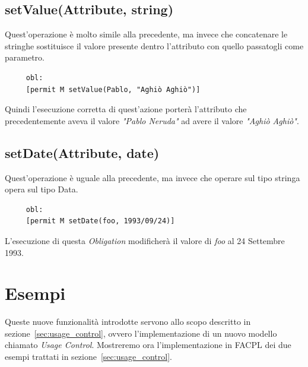 \subsection*{setValue(Attribute, string)}
\label{ssub:opsetvalue}

Quest'operazione è molto simile alla precedente, ma invece che concatenare le stringhe sostituisce il valore presente dentro l'attributo con quello passatogli come parametro.
\begin{verbatim}
	 obl:
     [permit M setValue(Pablo, "Aghiò Aghiò")]
\end{verbatim}
Quindi l'esecuzione corretta di quest'azione porterà l'attributo che precedentemente aveva il valore 
\textit{"Pablo Neruda"} ad avere il valore \textit{"Aghiò Aghiò"}.


\subsection*{setDate(Attribute, date)}
\label{ssub:opsetvalue}

Quest'operazione è uguale alla precedente, ma invece che operare sul tipo stringa opera sul tipo Data.
\begin{verbatim}
	 obl:
     [permit M setDate(foo, 1993/09/24)]
\end{verbatim}
L'esecuzione di questa \textit{Obligation} modificherà il valore di \textit{foo} al 24 Settembre 1993.


\section{Esempi} %
\label{sec:esempi}

Queste nuove funzionalità introdotte servono allo scopo descritto in sezione~\ref{sec:usage_control}, ovvero l'implementazione di un nuovo modello chiamato \textit{Usage Control}.
Mostreremo ora l'implementazione in FACPL dei due esempi trattati in sezione~\ref{sec:usage_control}. 
